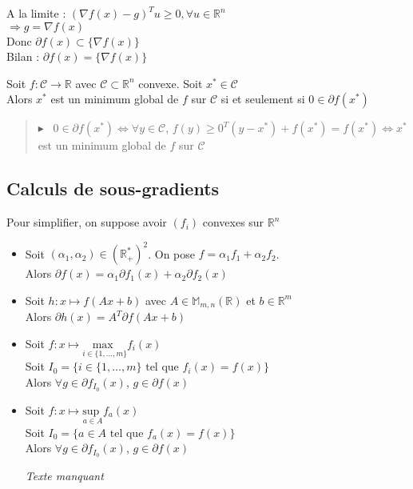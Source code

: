 \documentclass[12pt,a4paper]{article}
\newcommand{\propriete}[2]{%
    \begin{tcolorbox}[colback=white,colframe=green!25!white,title=\textbf{Propriété #1}, coltitle=black]
        #2
    \end{tcolorbox}
}
\newcommand{\preuve}[1]{%
    \begin{quote}
        $\blacktriangleright$~#1
    \end{quote}
}
\begin{document}
{\begin{enumerate}[label=\roman*)]
\begin{itemize}
            A la limite : $(\nabla f(x) - g)^T u \geq 0, \forall u \in \mathbb{R}^n$\\
            $\Rightarrow g = \nabla f(x)$\\
    
            Donc $\partial f(x) \subset \{\nabla f(x)\}$\\
    
            Bilan : $\partial f(x) = \{\nabla f(x)\}$\\
        \end{itemize}
    \end{enumerate}    
}



\propriete{}{
    Soit $f : \mathcal{C} \rightarrow \mathbb{R}$ avec $\mathcal{C} \subset \mathbb{R}^n$ convexe.
    Soit $x^* \in \mathcal{C}$\\
    Alors $x^*$ est un minimum global de $f$ sur $\mathcal{C}$ si et seulement si $0 \in \partial f(x^*)$
}

\preuve{
    $0 \in \partial f(x^*) \Leftrightarrow \forall y \in \mathcal{C}$, $f(y) \geq 0^T(y - x^*) + f(x^*) = f(x^*) \Leftrightarrow x^*$ est un minimum global de $f$ sur $\mathcal{C}$
}


\subsection{Calculs de sous-gradients}

Pour simplifier, on suppose avoir $(f_i)$ convexes sur $\mathbb{R}^n$

\propriete{}{
    \begin{itemize}
        \item Soit $(\alpha_1, \alpha_2) \in (\mathbb{R}_+^*)^2$.
        On pose $f = \alpha_1 f_1 + \alpha_2 f_2$.\\
        Alors $\partial f(x) = \alpha_1 \partial f_1(x) + \alpha_2 \partial f_2(x)$
        \item Soit $h : x \mapsto f(Ax + b)$ avec $A \in \mathbb{M}_{m,n}(\mathbb{R})$ et $b \in \mathbb{R}^m$\\
        Alors $\partial h(x) = A^T \partial f(Ax + b)$
        \item Soit $f : x \mapsto \underset{i \in \{1, \dots, m\}}{\text{max }} f_i(x)$\\
        Soit $I_0 = \{i \in \{1, \dots, m\} \text{ tel que } f_i(x) = f(x)\}$\\
        Alors $\forall g \in \partial f_{I_0}(x)$, $g \in \partial f(x)$
        \item Soit $f : x \mapsto \underset{a \in A}{\text{sup }} f_a(x)$\\
        Soit $I_0 = \{a \in A \text{ tel que } f_a(x) = f(x)\}$\\
        Alors $\forall g \in \partial f_{I_0}(x)$, $g \in \partial f(x)$

        \textit{Texte manquant}
    \end{itemize}
}
\end{document}
